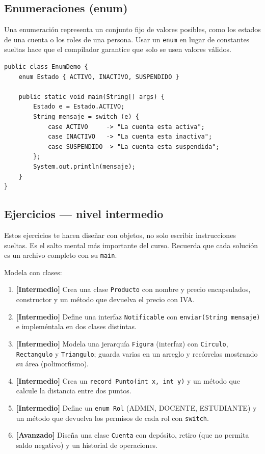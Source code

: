\documentclass[11pt]{article}
\begin{document}
\subsection{Enumeraciones (enum)}
Una enumeración representa un conjunto fijo de valores posibles, como los estados de una cuenta o los roles de una persona. Usar un \texttt{enum} en lugar de constantes sueltas hace que el compilador garantice que solo se usen valores válidos.

\begin{cajacodigo}
\begin{lstlisting}[style=java]
public class EnumDemo {
    enum Estado { ACTIVO, INACTIVO, SUSPENDIDO }

    public static void main(String[] args) {
        Estado e = Estado.ACTIVO;
        String mensaje = switch (e) {
            case ACTIVO     -> "La cuenta esta activa";
            case INACTIVO   -> "La cuenta esta inactiva";
            case SUSPENDIDO -> "La cuenta esta suspendida";
        };
        System.out.println(mensaje);
    }
}
\end{lstlisting}
\end{cajacodigo}
\vspace{2pt}
\subsection{Ejercicios — nivel intermedio}
Estos ejercicios te hacen diseñar con objetos, no solo escribir instrucciones sueltas. Es el salto mental más importante del curso. Recuerda que cada solución es un archivo completo con su \texttt{main}.

Modela con clases:

\begin{enumerate}[leftmargin=1.7em,itemsep=3pt,topsep=2pt]
\item \textbf{[Intermedio]} Crea una clase \texttt{Producto} con nombre y precio encapsulados, constructor y un método que devuelva el precio con IVA.
\item \textbf{[Intermedio]} Define una interfaz \texttt{Notificable} con \texttt{enviar(String mensaje)} e impleméntala en dos clases distintas.
\item \textbf{[Intermedio]} Modela una jerarquía \texttt{Figura} (interfaz) con \texttt{Circulo}, \texttt{Rectangulo} y \texttt{Triangulo}; guarda varias en un arreglo y recórrelas mostrando su área (polimorfismo).
\item \textbf{[Intermedio]} Crea un \texttt{record Punto(int x, int y)} y un método que calcule la distancia entre dos puntos.
\item \textbf{[Intermedio]} Define un \texttt{enum Rol} (ADMIN, DOCENTE, ESTUDIANTE) y un método que devuelva los permisos de cada rol con \texttt{switch}.
\item \textbf{[Avanzado]} Diseña una clase \texttt{Cuenta} con depósito, retiro (que no permita saldo negativo) y un historial de operaciones.
\end{enumerate}
\end{document}
